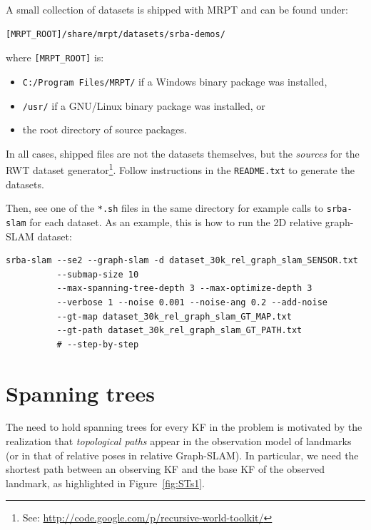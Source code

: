 \documentclass[a4paper,11pt]{article}
\begin{document}
A small collection of datasets is shipped with MRPT and can be found under:

\begin{lstlisting}
[MRPT_ROOT]/share/mrpt/datasets/srba-demos/
\end{lstlisting}

\noindent where \texttt{[MRPT\_ROOT]} is: 
\begin{itemize}
 \item \texttt{C:/Program Files/MRPT/} if a Windows binary package was installed,
 \item \texttt{/usr/} if a GNU/Linux binary package was installed, or
 \item the root directory of source packages.
\end{itemize}

In all cases, shipped files are not the datasets themselves, but the \emph{sources}
for the RWT dataset generator\footnote{See: 
\href{http://code.google.com/p/recursive-world-toolkit/}{http://code.google.com/p/recursive-world-toolkit/}}. 
Follow instructions in the \texttt{README.txt} to generate the datasets. 

Then, see one of the \texttt{*.sh} files in the same directory for example calls to \texttt{srba-slam} for each dataset. 
As an example, this is how to run the 2D relative graph-SLAM dataset:


\begin{lstlisting}
srba-slam --se2 --graph-slam -d dataset_30k_rel_graph_slam_SENSOR.txt 
          --submap-size 10 
          --max-spanning-tree-depth 3 --max-optimize-depth 3
          --verbose 1 --noise 0.001 --noise-ang 0.2 --add-noise 
          --gt-map dataset_30k_rel_graph_slam_GT_MAP.txt 
          --gt-path dataset_30k_rel_graph_slam_GT_PATH.txt 
          # --step-by-step 
\end{lstlisting}



\newpage
\section{Spanning trees}

The need to hold spanning trees for every KF in the problem is motivated 
by the realization that \emph{topological paths} appear in the observation 
model of landmarks (or in that of relative poses in relative Graph-SLAM). 
In particular, we need the shortest path
between an observing KF and the base KF of the observed landmark, as highlighted 
in Figure~\ref{fig:STs1}.
\end{document}
